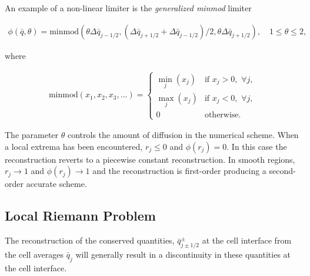 \documentclass[SingleSpace,12pt]{Serre_ASCE}
\begin{document}
An example of a non-linear limiter is the \emph{generalized
minmod} limiter \cite{vanLeer-B-1979-101}
\begin{linenomath*}
\begin{gather*}
\phi(\bar{q},\theta) = \text{minmod} \left ( \theta \Delta \bar{q}_{j-1/2}, (\Delta \bar{q}_{j+1/2} + \Delta \bar{q}_{j-1/2})/2, \theta \Delta \bar{q}_{j+1/2} \right ), \quad 1 \leq \theta \leq 2,
\end{gather*}
\end{linenomath*}
where
\begin{linenomath*}
\begin{eqnarray*}
\textrm{minmod}(x_1,x_2,x_3,...) = \left \lbrace
\begin{array}{cl}
\underset{j}{\min}(x_j) & \text{if} \,\, x_j > 0, \,\, \forall j, \\
\underset{j}{\max}(x_j) & \text{if} \,\, x_j < 0, \,\, \forall j, \\
0 & \text{otherwise}.
\end{array}
\right .
\end{eqnarray*}
\end{linenomath*}
The parameter $\theta$ controls the amount of diffusion in the numerical scheme. When a local extrema has been encountered, $r_j \le 0$ and $\phi(r_j) = 0$. In this case the reconstruction reverts to a piecewise constant reconstruction. In smooth regions, $r_j \rightarrow 1$ and $\phi(r_j) \rightarrow 1$ and the reconstruction is first-order producing a second-order accurate scheme.

\subsection{Local Riemann Problem} %

The reconstruction of the conserved quantities, $\bar{q}^\pm_{j \pm 1/2}$ at the cell interface from the cell averages $\bar{q}_j$ will generally result in a discontinuity in these quantities at the cell interface.
\end{document}
